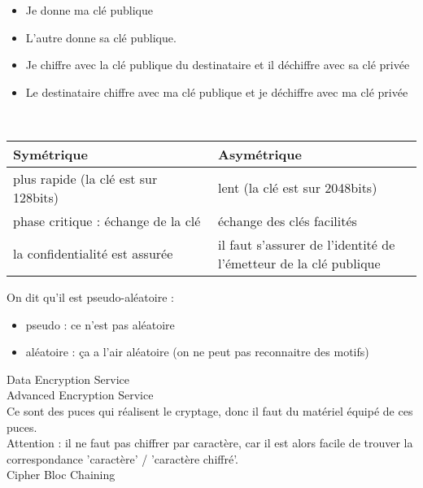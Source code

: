 \begin{itemize}
	\item Je donne ma clé publique
	\item L'autre donne sa clé publique.
	\item Je chiffre avec la clé publique du destinataire et il déchiffre avec sa clé privée
	\item Le destinataire chiffre avec ma clé publique et je déchiffre avec ma clé privée
\end{itemize}

\\
\begin{tabular}{p{0.5\linewidth}|p{0.5\linewidth}}
	Symétrique & Asymétrique \\ \hline \hline
	plus rapide (la clé est sur 128bits) & lent (la clé est sur 2048bits) \\ \hline
	phase critique : échange de la clé & échange des clés facilités \\ \hline
	la confidentialité est assurée & il faut s'assurer de l'identité de l'émetteur de la clé publique \\ \hline
\end{tabular}

 On dit qu'il est pseudo-aléatoire :
\begin{itemize}
	\item pseudo : ce n'est pas aléatoire
	\item aléatoire : ça a l'air aléatoire (on ne peut pas reconnaitre des motifs)
\end{itemize}

 Data Encryption Service \\

 Advanced Encryption Service \\

 Ce sont des puces qui réalisent le cryptage, donc il faut du matériel équipé de ces puces. \\

 Attention : il ne faut pas chiffrer par caractère, car il est alors facile de trouver la correspondance 'caractère' / 'caractère chiffré'.\\

 Cipher Bloc Chaining

